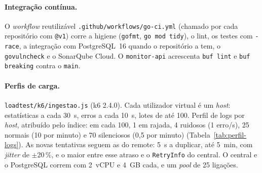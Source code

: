 \paragraph{Integração contínua.}
O \emph{workflow} reutilizável \texttt{.github/workflows/go-ci.yml} (chamado por cada repositório com
\texttt{@v1}) corre a higiene (\texttt{gofmt}, \texttt{go mod tidy}), o lint, os testes com \texttt{-race}, a
integração com PostgreSQL~16 quando o repositório a tem, o \texttt{govulncheck} e o SonarQube Cloud. O
\texttt{monitor-api} acrescenta \texttt{buf lint} e \texttt{buf breaking} contra o \texttt{main}.

\paragraph{Perfis de carga.}
\texttt{loadtest/k6/ingestao.js} (k6 2.4.0). Cada utilizador virtual é um \emph{host}: estatísticas a cada
30~s, erros a cada 10~s, lotes de até 100. Perfil de logs por \emph{host}, atribuído pelo índice: em cada 100,
1 em rajada, 4 ruidosos (1 erro/s), 25 normais (10 por minuto) e 70 silenciosos (0,5 por minuto)
(Tabela~\ref{tab:perfil-logs}). As novas tentativas seguem as do remote: 5~s a duplicar, até 5~min, com
\emph{jitter} de $\pm$20\,\%, e o maior entre esse atraso e o \texttt{RetryInfo} do central. O central e o
PostgreSQL correm com 2~vCPU e 4~GB cada, e um \emph{pool} de 25 ligações.
